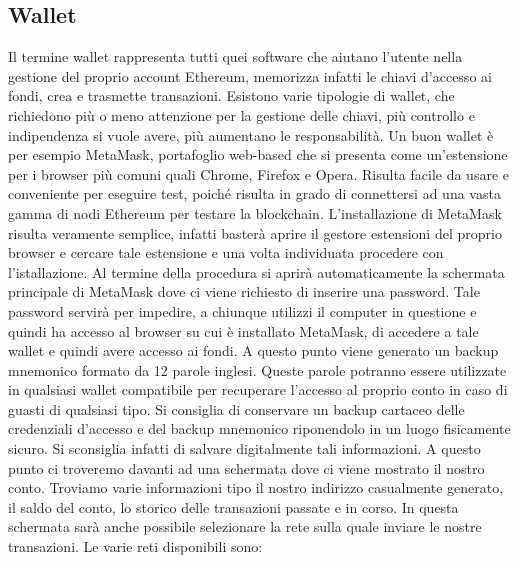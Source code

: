 \subsection*{Wallet}
Il termine wallet rappresenta tutti quei software che aiutano l'utente nella gestione del proprio account Ethereum, memorizza infatti le chiavi d'accesso ai fondi, crea e trasmette transazioni. Esistono varie tipologie di wallet, che richiedono più o meno attenzione per la gestione delle chiavi, più controllo e indipendenza si vuole avere, più aumentano le responsabilità. Un buon wallet è per esempio MetaMask, portafoglio web-based che si presenta come un'estensione per i browser più comuni quali Chrome, Firefox e Opera. Risulta facile da usare e conveniente per eseguire test, poiché risulta in grado di connettersi ad una vasta gamma di nodi Ethereum per testare la blockchain. L'installazione di MetaMask risulta veramente semplice, infatti basterà aprire il gestore estensioni del proprio browser e cercare tale estensione e una volta individuata procedere con l'istallazione. Al termine della procedura si aprirà automaticamente la schermata principale di MetaMask dove ci viene richiesto di inserire una password. Tale password servirà per impedire, a chiunque utilizzi il computer in questione e quindi ha accesso al browser su cui è installato MetaMask, di accedere a tale wallet e quindi avere accesso ai fondi. A questo punto viene generato un backup mnemonico formato da 12 parole inglesi. Queste parole potranno essere utilizzate in qualsiasi wallet compatibile per recuperare l'accesso al proprio conto in caso di guasti di qualsiasi tipo. Si consiglia di conservare un backup cartaceo delle credenziali d'accesso e del backup mnemonico riponendolo in un luogo fisicamente sicuro. Si sconsiglia infatti di salvare digitalmente tali informazioni.
A questo punto ci troveremo davanti ad una schermata dove ci viene mostrato il nostro conto. Troviamo varie informazioni tipo il nostro indirizzo casualmente generato, il saldo del conto, lo storico delle transazioni passate e in corso. In questa schermata sarà anche possibile selezionare la rete sulla quale inviare le nostre transazioni. Le varie reti disponibili sono:

